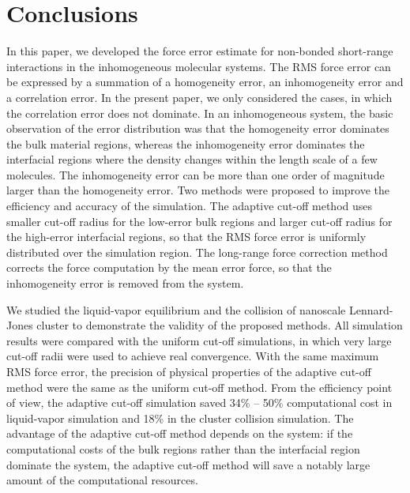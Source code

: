 \documentclass[preprint]{revtex4}
\begin{document}
\section{Conclusions}\label{sec:conclusion}

In this paper, we developed the force error estimate for non-bonded
short-range interactions in the inhomogeneous molecular systems. The
RMS force error can be expressed by a summation of a homogeneity
error, an inhomogeneity error and a correlation error. In the present
paper, we only considered the cases, in which the correlation error
does not dominate. In an inhomogeneous system, the basic observation
of the error distribution was that the homogeneity error dominates the
bulk material regions, whereas the inhomogeneity error dominates the
interfacial regions where the density changes within the length scale
of a few molecules. The inhomogeneity error can be more than one
order of magnitude larger than the homogeneity error.  Two methods
were proposed to improve the efficiency and accuracy of the
simulation. The adaptive cut-off method uses smaller cut-off radius
for the low-error bulk regions and larger cut-off radius for the
high-error interfacial regions, so that the RMS force error is
uniformly distributed over the simulation region. The long-range force
correction method corrects the force computation by the mean error
force, so that the inhomogeneity error is removed from the system.

We studied the liquid-vapor equilibrium and the collision of nanoscale
Lennard-Jones cluster to demonstrate the validity of the proposed
methods.  All simulation results were compared with the uniform
cut-off simulations, in which very large cut-off radii were used to
achieve real convergence.  With the same maximum RMS force error,
the precision of physical properties of the adaptive cut-off method
were the same as the uniform cut-off method. From the efficiency
point of view,
the adaptive cut-off simulation saved 34\% -- 50\% computational cost
in liquid-vapor simulation and 18\% in the cluster collision simulation.
The advantage of the adaptive cut-off method depends on the
system:{
  if the computational costs of the bulk regions rather than the
  interfacial region dominate the system,}
the adaptive cut-off method will save a notably large amount of the
computational resources.
\end{document}
